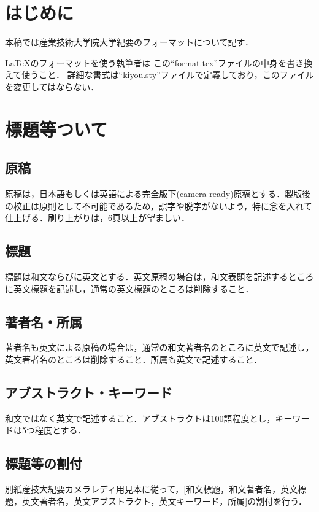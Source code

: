 \documentclass[a4j,twoside]{jarticle}
\begin{document}
\renewcommand{\thefootnote}{*\arabic{footnote}}
\setcounter{footnote}{0}
\begin{multicols}{2} %
\small %

\section{はじめに}
本稿では産業技術大学院大学紀要のフォーマットについて記す．

\LaTeX のフォーマットを使う執筆者は
この``format.tex''ファイルの中身を書き換えて使うこと．
詳細な書式は``kiyou.sty''ファイルで定義しており，このファイルを変更してはならない．

\section{標題等ついて}
\subsection{原稿}
原稿は，日本語もしくは英語による完全版下(camera ready)原稿とする．製版後の校正は原則として不可能であるため，誤字や脱字がないよう，特に念を入れて仕上げる．刷り上がりは，6頁以上が望ましい．

\subsection{標題}
標題は和文ならびに英文とする．英文原稿の場合は，和文表題を記述するところに英文標題を記述し，通常の英文標題のところは削除すること．

\subsection{著者名・所属}
著者名も英文による原稿の場合は，通常の和文著者名のところに英文で記述し，英文著者名のところは削除すること．所属も英文で記述すること．

\subsection{アブストラクト・キーワード}
和文ではなく英文で記述すること．アブストラクトは100語程度とし，キーワードは5つ程度とする．

\subsection{標題等の割付}
別紙産技大紀要カメラレディ用見本に従って，[和文標題，和文著者名，英文標
題，英文著者名，英文アブストラクト，英文キーワード，所属]の割付を行う．


\end{multicols}
\end{document}
